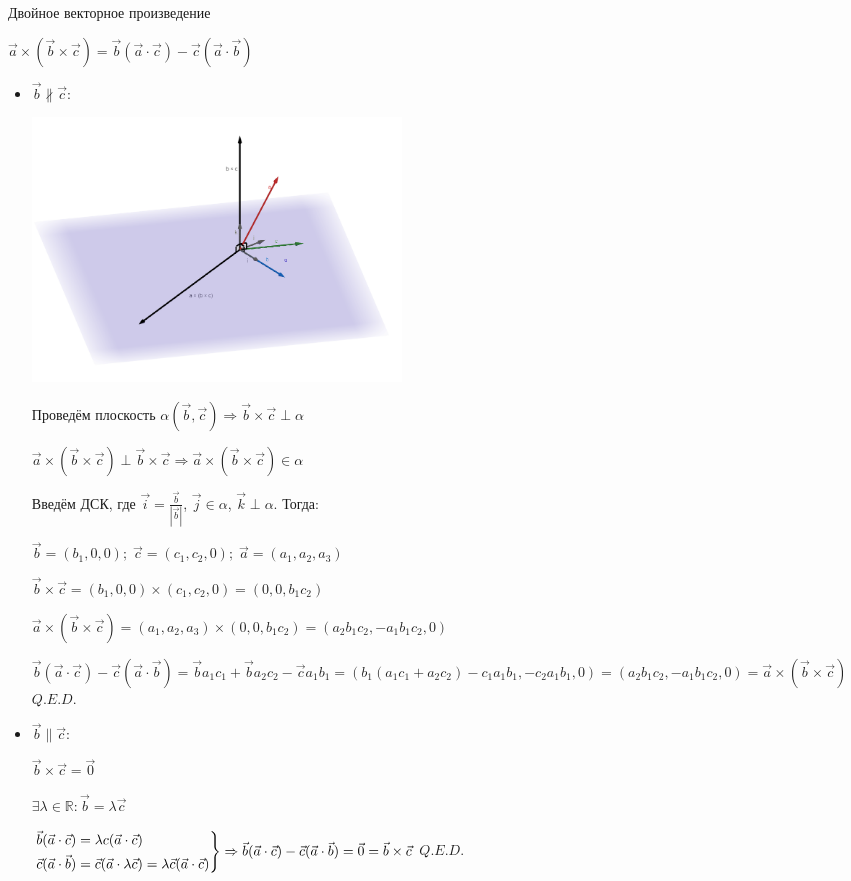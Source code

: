 \documentclass[twoside]{book}
\begin{document}
Двойное векторное произведение

\(\vec a \times (\vec b \times \vec c) = \vec b(\vec a \cdot \vec c) - \vec c(\vec a \cdot \vec b)\)
\begin{itemize}
    \item \(\vec b \nparallel \vec c\):
          \begin{center}
              \includegraphics[height=7cm]{Images/Chapter_1/1-7-1.png}
          \end{center}
          Проведём плоскость \(\alpha(\vec b, \vec c) \Rightarrow \vec b \times \vec c \perp \alpha\)

          \(\vec a \times (\vec b \times \vec c) \perp \vec b \times \vec c \Rightarrow \vec a \times (\vec b \times \vec c) \in \alpha\)

          Введём ДСК, где \(\vec i = \frac{\vec b}{|\vec b|}\), \(\vec j \in \alpha\), \(\vec k \perp \alpha\). Тогда:

          \(\vec b = (b_1, 0, 0);\; \vec c = (c_1, c_2, 0);\; \vec a = (a_1, a_2, a_3)\)

          \(\vec b \times \vec c = (b_1, 0, 0) \times (c_1, c_2, 0) = (0, 0, b_1 c_2)\)

          \(\vec a \times (\vec b \times \vec c) = (a_1, a_2, a_3) \times (0, 0, b_1 c_2) = (a_2 b_1 c_2, -a_1 b_1 c_2, 0)\)

          \(\vec b(\vec a \cdot \vec c) - \vec c(\vec a \cdot \vec b) = \vec b a_1 c_1 + \vec b a_2 c_2 - \vec c a_1 b_1 =
          (b_1(a_1 c_1 + a_2 c_2) - c_1 a_1 b_1, -c_2 a_1 b_1, 0) =
          (a_2 b_1 c_2, -a_1 b_1 c_2, 0) = \vec a \times (\vec b \times \vec c)\) \(Q.E.D.\)
    \item \(\vec b \parallel \vec c\):

          \(\vec b \times \vec c = \vec 0\)

          \(\exists \lambda \in \mathbb{R}: \vec b = \lambda \vec c\)

          \(\begin{rcases}
              \vec b(\vec a \cdot \vec c) = \lambda c(\vec a \cdot \vec c) \\
              \vec c(\vec a \cdot \vec b) = \vec c(\vec a \cdot \lambda\vec c) = \lambda \vec c(\vec a \cdot \vec c)
          \end{rcases} \Rightarrow \vec b(\vec a \cdot \vec c) - \vec c(\vec a \cdot \vec b) = \vec 0 = \vec b \times \vec c\) \(Q.E.D.\)
\end{itemize}
\end{document}
